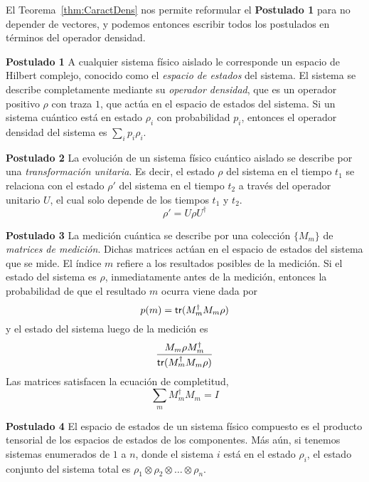 El Teorema~\ref{thm:CaractDens} nos permite reformular el
\textbf{Postulado 1} para no depender de vectores, y podemos entonces
escribir todos los postulados en términos del operador densidad.


\begin{displayquote}\label{post:espacio}
  \textbf{Postulado 1} A cualquier sistema físico aislado le corresponde un espacio de Hilbert complejo, conocido como el \emph{espacio de estados} del sistema. El sistema se describe completamente mediante su \emph{operador densidad}, que es un operador positivo $\rho$ con traza $1$, que actúa en el espacio de estados del sistema. Si un sistema cuántico está en estado $\rho_i$ con
  probabilidad $p_i$, entonces el operador densidad del sistema es $\sum_i p_i\rho_i$.
\end{displayquote}

\begin{displayquote}\label{post:evolucion}
  \textbf{Postulado 2} La evolución de un sistema físico cuántico aislado se describe por una
  \emph{transformación unitaria}. Es decir, el estado $\rho$ del sistema en el
  tiempo $t_1$ se relaciona con el estado $\rho'$ del sistema en el tiempo $t_2$
  a través del operador unitario $U$, el cual solo depende de los tiempos $t_1$
  y $t_2$.
  \[
    \rho' = U\rho U^\dagger
  \]
\end{displayquote}

\begin{displayquote}\label{post:medicion}
  \textbf{Postulado 3} La medición cuántica se describe por una colección $\{M_m\}$ de \emph{matrices
    de medición}. Dichas matrices actúan en el espacio de estados del sistema
  que se mide. El índice $m$ refiere a los resultados posibles de la medición.
  Si el estado del sistema es $\rho$, inmediatamente antes de la medición,
  entonces la probabilidad de que el resultado $m$ ocurra viene dada por
  \begin{equation}\label{eq:probmeas}
    p(m) = \mathsf{tr}(M_m^\dagger M_m\rho)
  \end{equation}
  y el estado del sistema luego de la medición es
  \begin{equation}\label{eq:statemeas}
    \frac{M_m\rho M_m^\dagger}{\mathsf{tr}(M_m^\dagger M_m\rho)}
  \end{equation}
  Las matrices satisfacen la ecuación de completitud,
  \[
    \sum_m M_m^\dagger M_m = I
  \]
\end{displayquote}

\begin{displayquote}\label{post:comp}
 \textbf{Postulado 4} El espacio de estados de un sistema físico compuesto es el producto tensorial
  de los espacios de estados de los componentes. Más aún, si tenemos sistemas
  enumerados de $1$ a $n$, donde el sistema $i$ está en el estado $\rho_i$, el
  estado conjunto del sistema total es \(
  \rho_1\otimes\rho_2\otimes\dots\otimes\rho_n \).
\end{displayquote}


